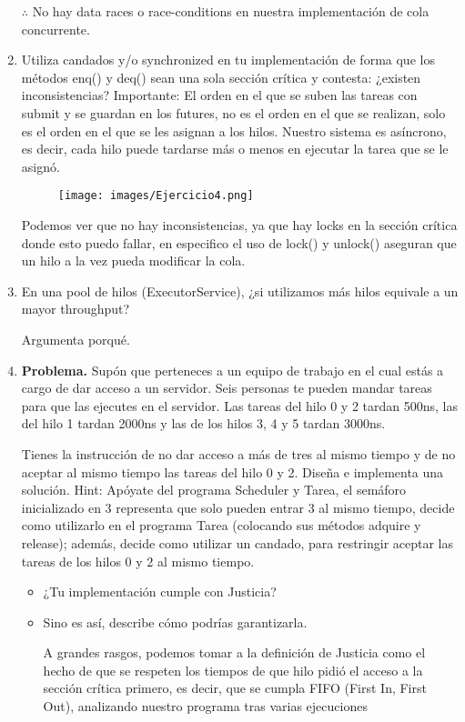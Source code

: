 \begin{enumerate}
$\therefore$ No hay data races o race-conditions en nuestra implementación de cola concurrente.

\hfill

\item  Utiliza candados y/o synchronized en tu implementación de forma que los métodos enq() y deq() sean una sola sección crítica y contesta: ¿existen inconsistencias?
Importante: El orden en el que se suben las tareas con submit y se guardan en los futures, no es el orden en el que se realizan, solo es el orden en el que se les asignan a los hilos. Nuestro sistema es asíncrono, es decir, cada hilo puede tardarse más o menos en ejecutar la tarea que se le asignó.

\begin{figure}[h]
    \centering
    \texttt{[image: images/Ejercicio4.png]}
\end{figure}

Podemos ver que no hay inconsistencias, ya que hay locks en la sección crítica donde esto puedo fallar, en especifico el uso de lock()  y unlock() aseguran que un hilo a la vez pueda modificar la cola.
\hfill

\hfill

\item En una pool de hilos (ExecutorService), ¿si utilizamos más hilos equivale a un mayor throughput?

Argumenta porqué.

\hfill

\item \textbf{Problema.} Supón que perteneces a un equipo de trabajo en el cual estás a cargo de dar acceso a un servidor. Seis personas te pueden mandar tareas para que las ejecutes en el servidor. Las tareas del hilo 0 y 2 tardan 500ns, las del hilo 1 tardan 2000ns y las de los hilos 3, 4 y 5 tardan 3000ns.

Tienes la instrucción de no dar acceso a más de tres al mismo tiempo y de no aceptar al mismo tiempo las tareas del hilo 0 y 2. Diseña e implementa una solución. Hint: Apóyate del programa Scheduler y Tarea, el semáforo inicializado en 3 representa que solo pueden entrar 3 al mismo tiempo, decide como utilizarlo en el programa Tarea (colocando sus métodos adquire y release); además, decide como utilizar un candado, para restringir aceptar las tareas de los hilos 0 y 2 al mismo tiempo.

\begin{itemize}
    \item ¿Tu implementación cumple con Justicia?

    \item Sino es así, describe cómo podrías garantizarla.

    A grandes rasgos, podemos tomar a la definición de Justicia como el hecho de que se respeten los tiempos de que hilo pidió el acceso a la sección crítica primero, es decir, que se cumpla FIFO (First In, First Out), analizando nuestro programa tras varias ejecuciones  
\end{itemize}
    
\end{enumerate}
